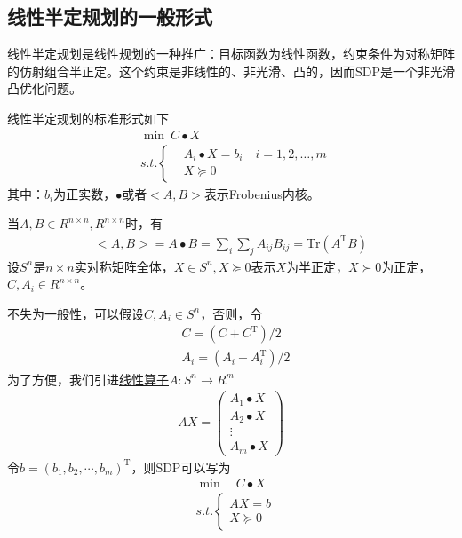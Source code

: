     \subsection{线性半定规划的一般形式}
        \par
        线性半定规划是线性规划的一种推广：目标函数为线性函数，约束条件为对称矩阵的仿射组合半正定。这个约束是非线性的、非光滑、凸的，因而SDP是一个非光滑凸优化问题。
        \par
        线性半定规划的标准形式如下
        \begin{align*}
          & \mathop{\min} \  C\bullet X\\
          & s.t.\left\{
          \begin{aligned}
          & A_i\bullet X=b_i\quad i=1,2,\ldots,m\\
          & X \succeq 0
          \end{aligned}
          \right.
        \end{align*}
        其中：$b_i$为正实数，$\bullet$或者$\big<{A,B}\big>$表示Frobenius内核。
        \par
        当$A,B\in R^{n\times n},R^{n\times n}$时，有
        \begin{align*}
          \big<{A,B}\big>=A\bullet B=\mathop{\sum}\limits_i\mathop{\sum}\limits_jA_{ij}B_{ij}=\mathrm{Tr}(A^\mathrm{T} B)
        \end{align*}
        设$S^n$是${n\times n}$实对称矩阵全体，$X \in S^n,X \succeq 0$表示$X$为半正定，$X\succ 0$为正定，$C,A_i \in R^{n\times n}$。
        \par
        不失为一般性，可以假设$C,A_i \in S^{n}$，否则，令
        \begin{align*}
          & C=(C+C^\mathrm{T} )/2\\
          & A_i=(A_i+A_i^\mathrm{T} )/2
        \end{align*}
        为了方便，我们引进\underline{线性算子$A:S^n \to R^m$}
        \begin{align*}
          AX=\begin{pmatrix} A_1\bullet X \\A_2\bullet X\\\vdots\\A_m\bullet X\end{pmatrix}
        \end{align*}
        令$b=(b_1,b_2,\cdots,b_m)^\mathrm{T} $，则SDP可以写为
        \begin{align*}
          & \mathop{\min} \quad C\bullet X\\
          & s.t.\left\{
          \begin{aligned}
          AX=b\\
          X \succeq 0
          \end{aligned}
          \right.
        \end{align*}
